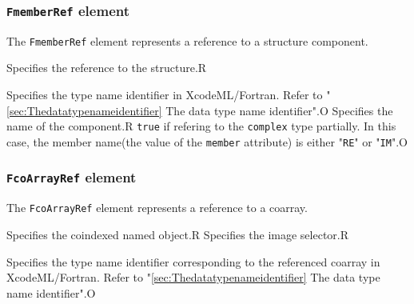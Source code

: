 \subsubsection{ {\tt FmemberRef} element}

The {\tt FmemberRef} element represents a reference to a structure component.


\begin{XcodeMLChildElements}
{Specifies the reference to the structure.}{R}
\end{XcodeMLChildElements}

\begin{XcodeMLAttributes}
{Specifies the type name identifier in XcodeML/Fortran.
 Refer to "\ref{sec:Thedatatypenameidentifier} The data type name identifier".}{O}
{Specifies the name of the component.}{R}
{{\tt true} if refering to the {\tt complex} type partially. In this case, the member name(the value of the {\tt member} attribute) is either "{\tt RE}" or "{\tt IM}".}{O}
\end{XcodeMLAttributes}


\subsubsection{ {\tt FcoArrayRef} element}

The {\tt FcoArrayRef} element represents a reference to a coarray.


\begin{XcodeMLChildElements}
{Specifies the coindexed named object.}{R}
{Specifies the image selector.}{R}
\end{XcodeMLChildElements}

\begin{XcodeMLAttributes}
{Specifies the type name identifier corresponding to the referenced coarray in XcodeML/Fortran.
 Refer to "\ref{sec:Thedatatypenameidentifier} The data type name identifier".}{O}
\end{XcodeMLAttributes}



